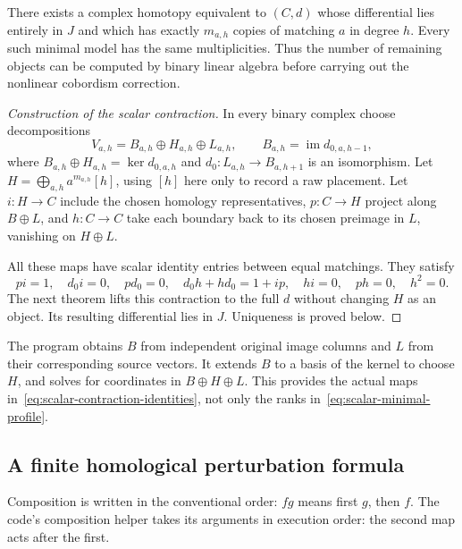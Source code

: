 \begin{theorem}
\label{thm:scalar-minimal-profile}
There exists a complex homotopy equivalent to $(C,d)$ whose differential
lies entirely in $J$ and which has exactly $m_{a,h}$ copies of matching
$a$ in degree $h$.  Every such minimal model has the same multiplicities.
Thus the number of remaining objects can be computed by binary linear
algebra before carrying out the nonlinear cobordism correction.
\end{theorem}

\begin{proof}[Construction of the scalar contraction]
In every binary complex choose decompositions
\[
 V_{a,h}=B_{a,h}\oplus H_{a,h}\oplus L_{a,h},
 \qquad
 B_{a,h}=\operatorname{im}d_{0,a,h-1},
\]
where $B_{a,h}\oplus H_{a,h}=\ker d_{0,a,h}$ and
$d_0:L_{a,h}\to B_{a,h+1}$ is an isomorphism.  Let
$H=\bigoplus_{a,h}a^{m_{a,h}}[h]$, using $[h]$ here only to record a raw
placement.  Let $i:H\to C$ include the chosen homology representatives,
$p:C\to H$ project along $B\oplus L$, and $h:C\to C$ take each boundary
back to its chosen preimage in $L$, vanishing on $H\oplus L$.

All these maps have scalar identity entries between equal matchings.  They
satisfy
\begin{equation}
 pi=1,\quad d_0i=0,\quad pd_0=0,\quad
 d_0h+hd_0=1+ip,\quad hi=0,\quad ph=0,\quad h^2=0.
 \label{eq:scalar-contraction-identities}
\end{equation}
The next theorem lifts this contraction to the full $d$ without changing
$H$ as an object.  Its resulting differential lies in $J$.  Uniqueness is
proved below.
\end{proof}

The program obtains $B$ from independent original image columns and $L$
from their corresponding source vectors.  It extends $B$ to a basis of
the kernel to choose $H$, and solves for coordinates in $B\oplus H\oplus L$.
This provides the actual maps in~\eqref{eq:scalar-contraction-identities},
not only the ranks in~\eqref{eq:scalar-minimal-profile}.

\subsection{A finite homological perturbation formula}

Composition is written in the conventional order: $fg$ means first $g$,
then $f$.  The code's composition helper takes its arguments in execution
order: the second map acts after the first.

